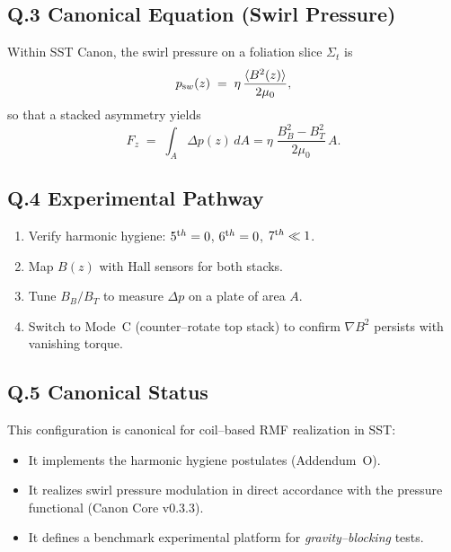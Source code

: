 \documentclass[10pt,reprint,aps,onecolumn,nofootinbib]{revtex4-2}
\begin{document}
\subsection*{Q.3 Canonical Equation (Swirl Pressure)}
Within SST Canon, the swirl pressure on a foliation slice $\Sigma_t$ is
\[
	p_{\textrm sw}(z) \;=\; \eta\,\frac{\langle B^2(z)\rangle}{2\mu_0},
\]
so that a stacked asymmetry yields
\[
	F_z \;=\; \int_A \Delta p(z)\,dA
	=\eta\;\frac{B_B^2-B_T^2}{2\mu_0}\,A.
\]

\subsection*{Q.4 Experimental Pathway}
\begin{enumerate}
	\item Verify harmonic hygiene: $5^{\textrm th}=0$, $6^{\textrm th}=0$, $7^{\textrm th}\ll1$.
	\item Map $B(z)$ with Hall sensors for both stacks.
	\item Tune $B_B/B_T$ to measure $\Delta p$ on a plate of area $A$.
	\item Switch to Mode~C (counter--rotate top stack) to confirm $\nabla B^2$ persists with vanishing torque.
\end{enumerate}

\subsection*{Q.5 Canonical Status}
This configuration is canonical for coil--based RMF realization in SST:
\begin{itemize}
	\item It implements the harmonic hygiene postulates (Addendum~O).
	\item It realizes swirl pressure modulation in direct accordance with the pressure functional (Canon Core v0.3.3).
	\item It defines a benchmark experimental platform for \emph{gravity--blocking} tests.
\end{itemize}
\end{document}
